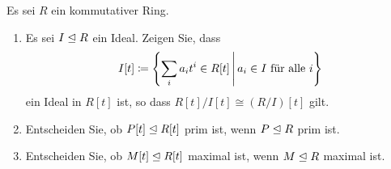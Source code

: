 \documentclass[a4paper, 10pt]{scrartcl}
\begin{document}
\begin{question}
  Es sei $R$ ein kommutativer Ring.
  \begin{enumerate}
    \item
      Es sei $I \mathrel{\trianglelefteq} R$ ein Ideal.
      Zeigen Sie, dass
      \[
                  I[t]
        \defined  \left\{
                    \sum_i a_i t^i \in R[t]
                  \suchthat*
                    \text{$a_i \in I$ für alle $i$}
                  \right\}
      \]
      ein Ideal in $R[t]$ ist, so dass $R[t]/I[t] \cong (R/I)[t]$ gilt.
    \item
      Entscheiden Sie, ob $P[t] \mathrel{\trianglelefteq} R[t]$ prim ist, wenn $P \mathrel{\trianglelefteq} R$ prim ist.
    \item
      Entscheiden Sie, ob $M[t] \mathrel{\trianglelefteq} R[t]$ maximal ist, wenn $M \mathrel{\trianglelefteq} R$ maximal ist.
  \end{enumerate}
\end{question}
\end{document}
